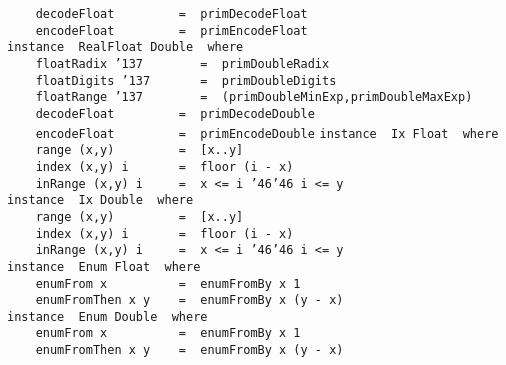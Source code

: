 \mbox{\tt \ \ \ \ decodeFloat\ \ \ \ \ \ \ \ \ =\ \ primDecodeFloat}\\
\mbox{\tt \ \ \ \ encodeFloat\ \ \ \ \ \ \ \ \ =\ \ primEncodeFloat}
\eprogB\noindent\bprogB
\mbox{\tt instance\ \ RealFloat\ Double\ \ where}\\
\mbox{\tt \ \ \ \ floatRadix\ {\char'137}\ \ \ \ \ \ \ \ =\ \ primDoubleRadix}\\
\mbox{\tt \ \ \ \ floatDigits\ {\char'137}\ \ \ \ \ \ \ =\ \ primDoubleDigits}\\
\mbox{\tt \ \ \ \ floatRange\ {\char'137}\ \ \ \ \ \ \ \ =\ \ (primDoubleMinExp,primDoubleMaxExp)}\\
\mbox{\tt \ \ \ \ decodeFloat\ \ \ \ \ \ \ \ \ =\ \ primDecodeDouble}\\
\mbox{\tt \ \ \ \ encodeFloat\ \ \ \ \ \ \ \ \ =\ \ primEncodeDouble}
\eprogB\noindent\bprogB
\mbox{\tt instance\ \ Ix\ Float\ \ where}\\
\mbox{\tt \ \ \ \ range\ (x,y)\ \ \ \ \ \ \ \ \ =\ \ [x..y]}\\
\mbox{\tt \ \ \ \ index\ (x,y)\ i\ \ \ \ \ \ \ =\ \ floor\ (i\ -\ x)}\\
\mbox{\tt \ \ \ \ inRange\ (x,y)\ i\ \ \ \ \ =\ \ x\ <=\ i\ {\char'46}{\char'46}\ i\ <=\ y}
\eprogB\noindent\bprogB
\mbox{\tt instance\ \ Ix\ Double\ \ where}\\
\mbox{\tt \ \ \ \ range\ (x,y)\ \ \ \ \ \ \ \ \ =\ \ [x..y]}\\
\mbox{\tt \ \ \ \ index\ (x,y)\ i\ \ \ \ \ \ \ =\ \ floor\ (i\ -\ x)}\\
\mbox{\tt \ \ \ \ inRange\ (x,y)\ i\ \ \ \ \ =\ \ x\ <=\ i\ {\char'46}{\char'46}\ i\ <=\ y}
\eprogB\noindent\bprogB
\mbox{\tt instance\ \ Enum\ Float\ \ where}\\
\mbox{\tt \ \ \ \ enumFrom\ x\ \ \ \ \ \ \ \ \ \ =\ \ enumFromBy\ x\ 1}\\
\mbox{\tt \ \ \ \ enumFromThen\ x\ y\ \ \ \ =\ \ enumFromBy\ x\ (y\ -\ x)}
\eprogB\noindent\bprogB
\mbox{\tt instance\ \ Enum\ Double\ \ where}\\
\mbox{\tt \ \ \ \ enumFrom\ x\ \ \ \ \ \ \ \ \ \ =\ \ enumFromBy\ x\ 1}\\
\mbox{\tt \ \ \ \ enumFromThen\ x\ y\ \ \ \ =\ \ enumFromBy\ x\ (y\ -\ x)}
\eprogB
